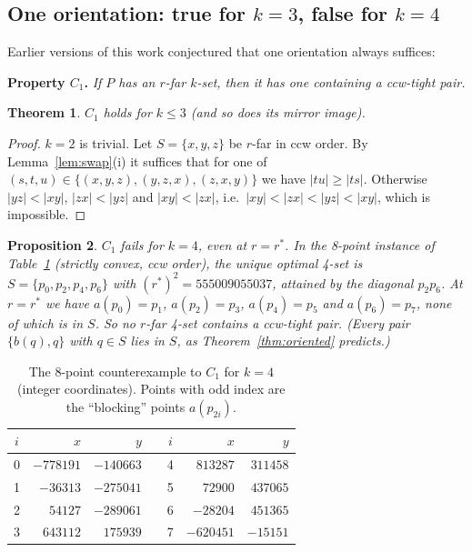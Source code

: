 \documentclass[11pt,a4paper]{article}
\newtheorem{theorem}{Theorem}
\newtheorem{proposition}[theorem]{Proposition}
\theoremstyle{definition}
\newcommand{\opt}{r^{*}}
\begin{document}
\subsection{One orientation: true for \texorpdfstring{$k=3$}{k=3}, false for \texorpdfstring{$k=4$}{k=4}}

Earlier versions of this work conjectured that one orientation always
suffices:

\smallskip\noindent\textbf{Property $C_1$.} \emph{If $P$ has an $r$-far
$k$-set, then it has one containing a ccw-tight pair.}

\begin{theorem}\label{thm:k3}
$C_1$ holds for $k\le3$ (and so does its mirror image).
\end{theorem}
\begin{proof}
$k=2$ is trivial. Let $S=\{x,y,z\}$ be $r$-far in ccw order. By
Lemma~\ref{lem:swap}(i) it suffices that for one of $(s,t,u)\in
\{(x,y,z),(y,z,x),(z,x,y)\}$ we have $|tu|\ge|ts|$. Otherwise
$|yz|<|xy|$, $|zx|<|yz|$ and $|xy|<|zx|$, i.e.\ $|xy|<|zx|<|yz|<|xy|$, which is
impossible.
\end{proof}

\begin{proposition}\label{prop:c1false}
$C_1$ fails for $k=4$, even at $r=\opt$. In the 8-point instance of
Table~\ref{tab:c1} (strictly convex, ccw order), the unique optimal 4-set is
$S=\{p_0,p_2,p_4,p_6\}$ with $(\opt)^2=555009055037$, attained by the diagonal
$p_2p_6$. At $r=\opt$ we have $a(p_0)=p_1$, $a(p_2)=p_3$, $a(p_4)=p_5$ and
$a(p_6)=p_7$, none of which is in $S$. So no $r$-far 4-set contains a ccw-tight
pair. (Every pair $\{b(q),q\}$ with $q\in S$ lies in $S$, as
Theorem~\ref{thm:oriented} predicts.)
\end{proposition}

\begin{table}[h]
\centering
\caption{The 8-point counterexample to $C_1$ for $k=4$ (integer
coordinates). Points with odd index are the ``blocking'' points $a(p_{2i})$.}
\label{tab:c1}
\small
\begin{tabular}{@{}c r r c c r r@{}}
\toprule
$i$ & $x$ & $y$ & \hspace{1em} & $i$ & $x$ & $y$ \\
\midrule
0 & $-778191$ & $-140663$ && 4 & $813287$ & $311458$ \\
1 & $-36313$ & $-275041$ && 5 & $72900$ & $437065$ \\
2 & $54127$ & $-289061$ && 6 & $-28204$ & $451365$ \\
3 & $643112$ & $175939$ && 7 & $-620451$ & $-15151$ \\
\bottomrule
\end{tabular}
\end{table}
\end{document}
